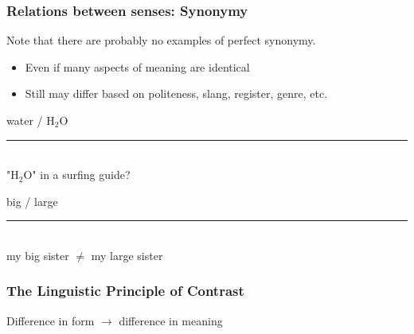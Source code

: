 \documentclass[13.5pt,aspecratio=169, xcolor=dvipsnames]{beamer}
\begin{document}
\begin{frame}
\onehalfspacing
    \frametitle{Relations between senses: Synonymy}
    {\large
    Note that there are probably no examples of perfect
synonymy.
    \begin{itemize}
\item Even if many aspects of meaning are identical
\item Still may differ based on politeness, slang, register, genre,
etc.
    \end{itemize}
    
    \bigskip
    \begin{minipage}{0.45\textwidth}
        \begin{block}{}
            \begin{center}
            water / $\mathrm{H_2 O}$ \\
            \vspace{-2em}
            \hspace{8em}\rule{0.5\textwidth}{0.4pt} \\
"$\mathrm{H_2 O}$" in a surfing guide?
            \end{center}
        \end{block}
    
    \end{minipage}
    \hspace{1em}
    \begin{minipage}{0.45\textwidth}
        \begin{block}{}
            \begin{center}
                big / large \\
            \vspace{-2em}
            \hspace{8em}\rule{0.5\textwidth}{0.4pt} \\
            my big sister $\ne$ my large sister
            \end{center}
        \end{block}
    
    \end{minipage}
    }

\end{frame}


\begin{frame}
    \onehalfspacing
        \frametitle{The Linguistic Principle of Contrast}
        {\LARGE
        \begin{center}
        Difference in form $\rightarrow$ difference in meaning
        \end{center}
        }
    
    \end{frame}
\end{document}
